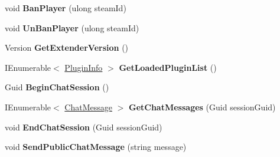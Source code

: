 \begin{DoxyCompactItemize}
\item 
\hypertarget{class_s_e_server_g_u_i_1_1_server_service_proxy_a4e92ac27a4bec6f5e9fa58d53a745203}{}void {\bfseries Ban\+Player} (ulong steam\+Id)\label{class_s_e_server_g_u_i_1_1_server_service_proxy_a4e92ac27a4bec6f5e9fa58d53a745203}

\item 
\hypertarget{class_s_e_server_g_u_i_1_1_server_service_proxy_ae00dc80835ab0ca7dfbc3a5f45bdd1ab}{}void {\bfseries Un\+Ban\+Player} (ulong steam\+Id)\label{class_s_e_server_g_u_i_1_1_server_service_proxy_ae00dc80835ab0ca7dfbc3a5f45bdd1ab}

\item 
\hypertarget{class_s_e_server_g_u_i_1_1_server_service_proxy_a5ee33817750fa69402db9a873947fbe0}{}Version {\bfseries Get\+Extender\+Version} ()\label{class_s_e_server_g_u_i_1_1_server_service_proxy_a5ee33817750fa69402db9a873947fbe0}

\item 
\hypertarget{class_s_e_server_g_u_i_1_1_server_service_proxy_ae74138f79bdbbe3d606b9080fb6b1c69}{}I\+Enumerable$<$ \hyperlink{class_s_e_comm_1_1_plugins_1_1_plugin_info}{Plugin\+Info} $>$ {\bfseries Get\+Loaded\+Plugin\+List} ()\label{class_s_e_server_g_u_i_1_1_server_service_proxy_ae74138f79bdbbe3d606b9080fb6b1c69}

\item 
\hypertarget{class_s_e_server_g_u_i_1_1_server_service_proxy_a28d99c30663d72444a4c413de9f1f6b3}{}Guid {\bfseries Begin\+Chat\+Session} ()\label{class_s_e_server_g_u_i_1_1_server_service_proxy_a28d99c30663d72444a4c413de9f1f6b3}

\item 
\hypertarget{class_s_e_server_g_u_i_1_1_server_service_proxy_af9f1390dcb49f4cfe1dfe53d279683ea}{}I\+Enumerable$<$ \hyperlink{class_s_e_mod_a_p_i_internal_1_1_a_p_i_1_1_chat_1_1_chat_message}{Chat\+Message} $>$ {\bfseries Get\+Chat\+Messages} (Guid session\+Guid)\label{class_s_e_server_g_u_i_1_1_server_service_proxy_af9f1390dcb49f4cfe1dfe53d279683ea}

\item 
\hypertarget{class_s_e_server_g_u_i_1_1_server_service_proxy_afeb91e4447acb5b29470636d4f52d02c}{}void {\bfseries End\+Chat\+Session} (Guid session\+Guid)\label{class_s_e_server_g_u_i_1_1_server_service_proxy_afeb91e4447acb5b29470636d4f52d02c}

\item 
\hypertarget{class_s_e_server_g_u_i_1_1_server_service_proxy_a9d1fb763c28399f9049bd3e4aa66b1de}{}void {\bfseries Send\+Public\+Chat\+Message} (string message)\label{class_s_e_server_g_u_i_1_1_server_service_proxy_a9d1fb763c28399f9049bd3e4aa66b1de}

\end{DoxyCompactItemize}


